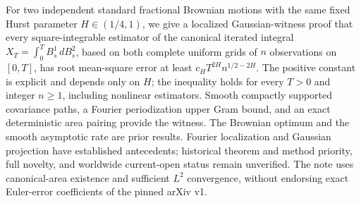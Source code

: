 For two independent standard fractional Brownian motions with the same fixed Hurst parameter $H\in(1/4,1)$, we give a localized Gaussian-witness proof that every square-integrable estimator of the canonical iterated integral $X_T=\int_0^T B^1_s\,dB^2_s$, based on both complete uniform grids of $n$ observations on $[0,T]$, has root mean-square error at least $c_HT^{2H}n^{1/2-2H}$. The positive constant is explicit and depends only on $H$; the inequality holds for every $T>0$ and integer $n\ge1$, including nonlinear estimators. Smooth compactly supported covariance paths, a Fourier periodization upper Gram bound, and an exact deterministic area pairing provide the witness. The Brownian optimum and the smooth asymptotic rate are prior results. Fourier localization and Gaussian projection have established antecedents; historical theorem and method priority, full novelty, and worldwide current-open status remain unverified. The note uses canonical-area existence and sufficient $L^2$ convergence, without endorsing exact Euler-error coefficients of the pinned arXiv v1.
